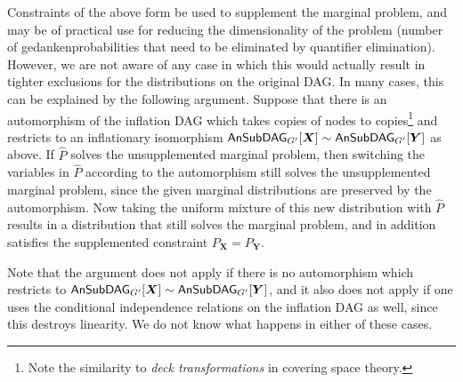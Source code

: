 \begin{asparadesc}
Constraints of the above form be used to supplement the marginal problem, and may be of practical use for reducing the dimensionality of the problem (number of gedankenprobabilities that need to be eliminated by quantifier elimination). However, we are not aware of any case in which this would actually result in tighter exclusions for the distributions on the original DAG. In many cases, this can be explained by the following argument. Suppose that there is an automorphism of the inflation DAG which takes copies of nodes to copies\footnote{Note the similarity to \emph{deck transformations} in covering space theory.} and restricts to an inflationary isomorphism $\ansubgraph[G']{\bm{X}}\sim\ansubgraph[G']{\bm{Y}}$ as above. If $\hat{P}$ solves the unsupplemented marginal problem, then switching the variables in $\hat{P}$ according to the automorphism still solves the unsupplemented marginal problem, since the given marginal distributions are preserved by the automorphism. Now taking the uniform mixture of this new distribution with $\hat{P}$ results in a distribution that still solves the marginal problem, and in addition satisfies the supplemented constraint $P_{\bm{X}} = P_{\bm{Y}}$.

Note that the argument does not apply if there is no automorphism which restricts to $\ansubgraph[G']{\bm{X}}\sim\ansubgraph[G']{\bm{Y}}$, and it also does not apply if one uses the conditional independence relations on the inflation DAG as well, since this destroys linearity. We do not know what happens in either of these cases.

\end{asparadesc}\clearpage



























